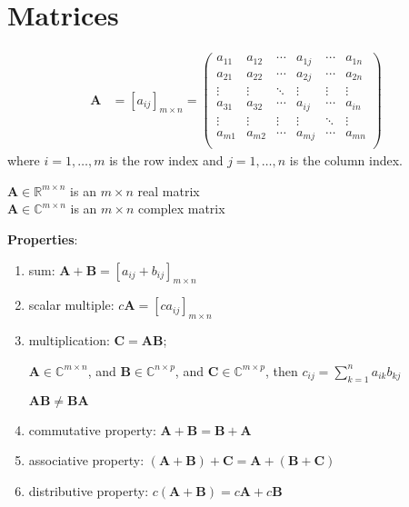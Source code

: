 \documentclass[12pt]{article}
\newcommand{\ve}[1]{\ensuremath{\mathbf{#1}}}
\begin{document}
\section{Matrices}

\begin{align}
    \ve{A} &= [a_{ij}]_{m\times n}   =    \begin{pmatrix}
      a_{11} & a_{12} & \cdots & a_{1j} & \cdots & a_{1n} \\
      a_{21} & a_{22} & \cdots & a_{2j} & \cdots & a_{2n} \\
       \vdots & \vdots & \ddots & \vdots & \vdots   & \vdots \\     
      a_{31} & a_{32} & \cdots & a_{ij} & \cdots & a_{in} \\
      \vdots & \vdots & \vdots & \vdots & \ddots   & \vdots \\
      a_{m1} & a_{m2} & \cdots & a_{mj} & \cdots & a_{mn} \\
    \end{pmatrix} \nonumber   
\end{align} 
%
where $i = 1, \dots, m$ is the row index and $j = 1, \dots, n$ is the column index.

$\ve{A} \in \mathbb{R}^{m \times n}$ is an $m \times n$ real matrix\\
$\ve{A} \in \mathbb{C}^{m \times n}$ is an $m \times n$ complex matrix

\textbf{Properties}:
%
\begin{enumerate}
\item sum: $\ve{A} + \ve{B} = [a_{ij} + b_{ij}]_{m \times n}$

\item scalar multiple: $c\ve{A} = [c a_{ij}]_{m \times n}$

\item multiplication: $\ve{C} = \ve{A}\ve{B}$;

$\ve{A} \in \mathbb{C}^{m \times n}$, and $\ve{B} \in \mathbb{C}^{n \times p}$, and $\ve{C} \in \mathbb{C}^{m \times p}$, then $c_{ij} = \sum_{k=1}^n a_{ik} b_{kj}$

$\ve{A}\ve{B} \neq \ve{B}\ve{A}$

\item commutative property: $\ve{A} + \ve{B} = \ve{B} + \ve{A}$

\item associative property: $(\ve{A} + \ve{B}) + \ve{C} = \ve{A} + (\ve{B} + \ve{C})$

\item distributive property: $c(\ve{A} + \ve{B}) = c\ve{A} + c\ve{B}$

\end{enumerate}
\end{document}
